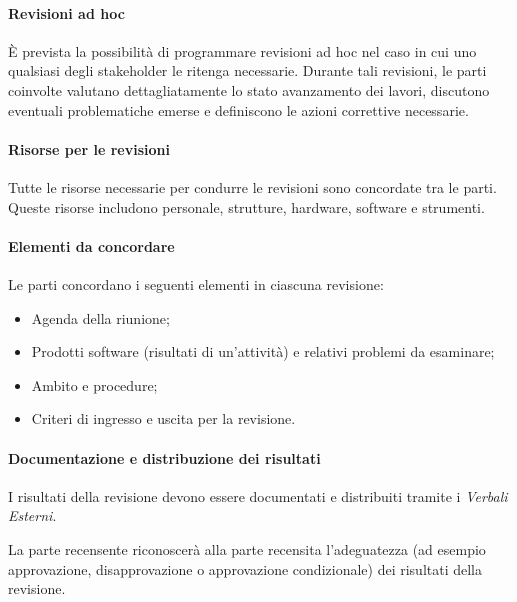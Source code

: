 \paragraph{Revisioni ad hoc}
È prevista la possibilità di programmare revisioni ad hoc nel caso in cui uno qualsiasi degli stakeholder le ritenga necessarie.
Durante tali revisioni, le parti coinvolte valutano dettagliatamente lo stato avanzamento dei lavori, discutono eventuali problematiche emerse e definiscono le azioni correttive necessarie.

\paragraph{Risorse per le revisioni}
Tutte le risorse necessarie per condurre le revisioni sono concordate tra le parti. Queste risorse includono personale, strutture, hardware, software e strumenti.

\paragraph{Elementi da concordare}
Le parti concordano i seguenti elementi in ciascuna revisione: 
\begin{itemize}
    \item Agenda della riunione;
    \item Prodotti software (risultati di un'attività) e relativi problemi da esaminare;
    \item Ambito e procedure;
    \item Criteri di ingresso e uscita per la revisione.
\end{itemize}


\paragraph{Documentazione e distribuzione dei risultati}
I risultati della revisione devono essere documentati e distribuiti tramite i \textit{Verbali Esterni}.

La parte recensente riconoscerà alla parte recensita l'adeguatezza (ad esempio approvazione, disapprovazione o approvazione condizionale) dei risultati della revisione. 

